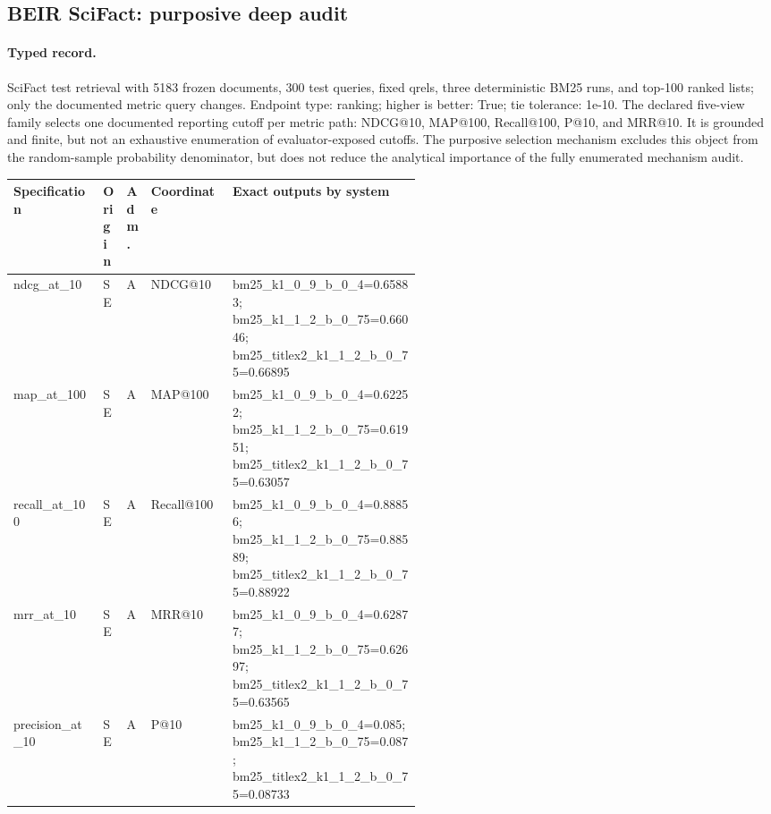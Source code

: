 \subsection{BEIR SciFact: purposive deep audit}\label{app:r8-beir-scifact}

\paragraph{Typed record.} SciFact test retrieval with 5183 frozen documents, 300 test queries, fixed qrels, three deterministic BM25 runs, and top-100 ranked lists; only the documented metric query changes. Endpoint type: ranking; higher is better: True; tie tolerance: 1e-10. The declared five-view family selects one documented reporting cutoff per metric path: NDCG@10, MAP@100, Recall@100, P@10, and MRR@10.  It is grounded and finite, but not an exhaustive enumeration of evaluator-exposed cutoffs.  The purposive selection mechanism excludes this object from the random-sample probability denominator, but does not reduce the analytical importance of the fully enumerated mechanism audit.

\begingroup\scriptsize
\setlength{\tabcolsep}{2pt}
\begin{tabularx}{\linewidth}{@{}p{0.22\linewidth}p{0.055\linewidth}p{0.055\linewidth}p{0.20\linewidth}X@{}}
\toprule Specification & Origin & Adm. & Coordinate & Exact outputs by system \\
\midrule
ndcg\_at\_10 & SE & A & NDCG@10 & bm25\_k1\_0\_9\_b\_0\_4=0.65883; bm25\_k1\_1\_2\_b\_0\_75=0.66046; bm25\_titlex2\_k1\_1\_2\_b\_0\_75=0.66895 \\
map\_at\_100 & SE & A & MAP@100 & bm25\_k1\_0\_9\_b\_0\_4=0.62252; bm25\_k1\_1\_2\_b\_0\_75=0.61951; bm25\_titlex2\_k1\_1\_2\_b\_0\_75=0.63057 \\
recall\_at\_100 & SE & A & Recall@100 & bm25\_k1\_0\_9\_b\_0\_4=0.88856; bm25\_k1\_1\_2\_b\_0\_75=0.88589; bm25\_titlex2\_k1\_1\_2\_b\_0\_75=0.88922 \\
mrr\_at\_10 & SE & A & MRR@10 & bm25\_k1\_0\_9\_b\_0\_4=0.62877; bm25\_k1\_1\_2\_b\_0\_75=0.62697; bm25\_titlex2\_k1\_1\_2\_b\_0\_75=0.63565 \\
precision\_at\_10 & SE & A & P@10 & bm25\_k1\_0\_9\_b\_0\_4=0.085; bm25\_k1\_1\_2\_b\_0\_75=0.087; bm25\_titlex2\_k1\_1\_2\_b\_0\_75=0.08733 \\
\bottomrule\end{tabularx}\endgroup

